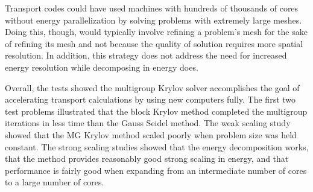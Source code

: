 Transport codes could have used machines with hundreds of thousands of cores without energy parallelization by solving problems with extremely large meshes. Doing this, though, would typically involve refining a problem's mesh for the sake of refining its mesh and not because the quality of solution requires more spatial resolution. In addition, this strategy does not address the need for increased energy resolution while decomposing in energy does. 

Overall, the tests showed the multigroup Krylov solver accomplishes the goal of accelerating transport calculations by using new computers fully. The first two test problems illustrated that the block Krylov method completed the multigroup iterations in less time than the Gauss Seidel method. The weak scaling study showed that the MG Krylov method scaled poorly when problem size was held constant. The strong scaling studies showed that the energy decomposition works, that the method provides reasonably good strong scaling in energy, and that performance is fairly good when expanding from an intermediate number of cores to a large number of cores. 

\separatorpage{}
